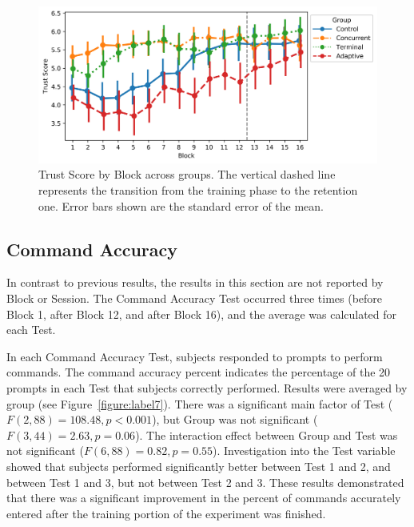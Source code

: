 \begin{figure}[hbt!]
	\centering
	\includegraphics[height=.4\textwidth]{figures/EMG/TrustScore}
	\caption[Trust Score by Block across groups]{Trust Score by Block across groups.
		The vertical dashed line represents the transition from the training phase to the retention one.
		Error bars shown are the standard error of the mean.}
	\label{figure:label6}
\end{figure}

\subsection{Command Accuracy}
In contrast to previous results, the results in this section are not reported by Block or Session.
The Command Accuracy Test occurred three times (before Block 1, after Block 12, and after Block 16), and the average was calculated for each Test.

In each Command Accuracy Test, subjects responded to prompts to perform commands.
The command accuracy percent indicates the percentage of the 20 prompts in each Test that subjects correctly performed.
Results were averaged by group (see Figure~\ref{figure:label7}).
There was a significant main factor of Test ($F(2, 88) = 108.48, p < 0.001$), but Group was not significant ($F(3, 44) = 2.63, p = 0.06$).
The interaction effect between Group and Test was not significant ($F(6, 88) = 0.82, p = 0.55$).
Investigation into the Test variable showed that subjects performed significantly better between Test 1 and 2, and between Test 1 and 3, but not between Test 2 and 3.
These results demonstrated that there was a significant improvement in the percent of commands accurately entered after the training portion of the experiment was finished.

